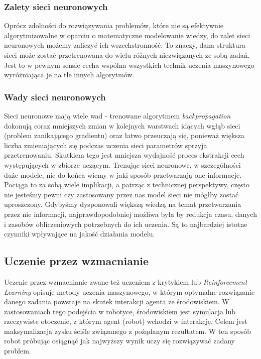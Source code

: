 \documentclass{article}
\begin{document}
\subsubsection*{\Large{Zalety sieci neuronowych}}
Oprócz zdolności do rozwiązywania problemów, które nie są efektywnie algorytmizowalne w oparciu o matematyczne modelowanie wiedzy, do zalet sieci neuronowych możemy zaliczyć ich wszechstronność. To znaczy, dana struktura sieci może zostać przetrenowana do wielu różnych niezwiązanych ze sobą zadań. Jest to w pewnym sensie cecha wspólna wszystkich technik uczenia maszynowego wyróżniająca je na tle innych algorytmów.

\subsubsection*{\Large{Wady sieci neuronowych}}
Sieci neuronowe mają wiele wad - trenowane algorytmem \emph{backpropagation} dokonują coraz mniejszych zmian w kolejnych warstwach idących wgłąb sieci (problem zanikającego gradientu) oraz łatwo przeuczają się, ponieważ większa liczba zmieniających się podczas uczenia sieci parametrów sprzyja przetrenowaniu. Skutkiem tego jest mniejsza wydajność proces ekstrakcji cech występujących w zbiorze uczącym. Trenując sieci neuronowe, w szczególności duże modele, nie do końca wiemy w jaki sposób przetwarzają one informacje. Pociąga to za sobą wiele implikacji, a patrząc z technicznej perspektywy, często nie jesteśmy pewni czy zastosowany przez nas model sieci nie mógłby zostać uproszczony. Gdybyśmy dysponowali większą wiedzą na temat przetwarzania przez nie informacji, najprawdopodobniej możliwa była by redukcja czasu, danych i zasobów obliczeniowych potrzebnych do ich uczenia. Są to najbardziej istotne czynniki wpływające na jakość działania modelu.

\subsection{\LARGE{Uczenie przez wzmacnianie}}
Uczenie przez wzmacnianie zwane też uczeniem z krytykiem lub \emph{Reinforcement Learning} opisuje metody uczenia maszynowego, w którym optymalne rozwiązanie danego zadania powstaje na skutek interakcji agenta ze środowiskiem. W zastosowaniach tego podejścia w robotyce, środowiskiem jest symulacja lub rzeczywiste otoczenie, z którym agent (robot) wchodzi w interakcję. Celem jest maksymalizacja zysku ściśle związanego z pożądanym rezultatem. W ten sposób robot próbując osiągnąć jak najwyższy wynik uczy się rozwiązywać zadany problem.
\end{document}
